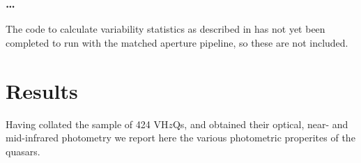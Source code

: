 \documentclass[usenatbib]{mnras}
\begin{document}
\subsubsection{\ldots}

The code to calculate variability statistics as described in \cite{Cross2009} has
not yet been completed to run with the matched aperture pipeline, so these are
not included.





\iffalse
\subsection{Filter and Survey choices} 
We make some choices when reporting our archival photometry. 
This includes:
\begin{itemize}
\item Report Pan-STARRS1 DR1 $grizy$ wherever we have it; 
\item Report WFCAM $YJHK$ (mainly from the UKIDSS); 
\item Report VIRCAM $YJHK_{\rm S}$ (mainly from the VISTA surveys); 
\item Report VIRCAM $YJH$ over WFCAM  $YJH$; 
\item Report both VIRCAM $K_{\rm S}$ and WFCAM  $K$; 
\item Report DECam $grz$ wherever we have it (mainly from the DES and DECaLS); 
\item Due to lack of coverage, do not report WFCAM $Z$-band. 
\end{itemize}
\fi




\section{Results}
Having collated the sample of 424 VH$z$Qs, and obtained their optical,
near- and mid-infrared photometry we report here the various
photometric properites of the quasars.
\end{document}
